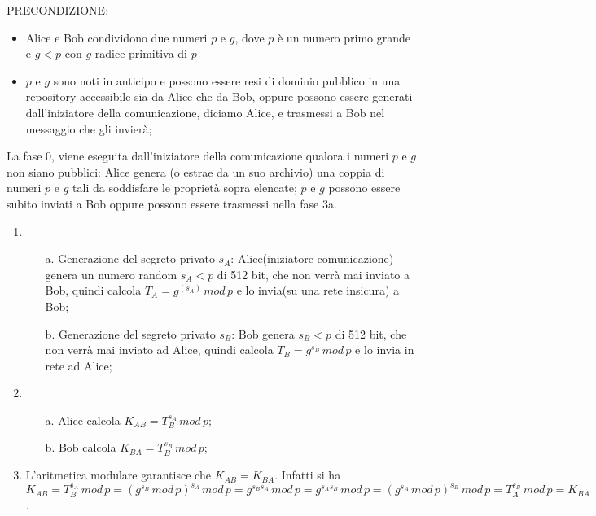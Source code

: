 PRECONDIZIONE: 
\begin{itemize}
\item Alice e Bob condividono due numeri $p$ e $g$, dove $p$ è un numero primo grande e $g<p$ con $g$ radice primitiva di $p$
\item $p$ e $g$ sono noti in anticipo e possono essere resi di dominio pubblico in una repository accessibile sia da Alice che da Bob, oppure possono essere generati dall'iniziatore della comunicazione,
diciamo Alice, e trasmessi a Bob nel messaggio che gli invierà;
\end{itemize}
La fase 0, viene eseguita dall'iniziatore della comunicazione qualora i numeri $p$ e $g$ non siano pubblici: Alice genera (o estrae da un suo archivio) una coppia di numeri $p$ e $g$ tali da soddisfare le proprietà sopra elencate; $p$ e $g$ possono essere subito inviati a Bob oppure possono essere trasmessi nella fase 3a.
\begin{enumerate}
\item \begin{enumerate}
\item [a.] Generazione del segreto privato $s_{A}$: Alice(iniziatore comunicazione) genera un numero random $s_{A}<p$ di 512 bit, che non verrà mai inviato a Bob, quindi calcola $T_{A}=g^(s_{A}) \, mod \,p$ e lo invia(su una rete insicura) a Bob;
\item [b.] Generazione del segreto privato $s_{B}$: Bob genera $s_{B}<p$ di 512 bit, che non verrà mai inviato ad Alice, quindi calcola $T_{B}=g^{s_{B}} \, mod \, p$ e lo invia in rete ad Alice;
\end{enumerate}
\item \begin{enumerate}
\item [a.] Alice calcola $K_{AB}=T_{B}^{s_{A}} \, mod \,p$;
\item [b.] Bob calcola $K_{BA}=T_{B}^{s_{B}} \, mod \, p$;
\end{enumerate}
\item L'aritmetica modulare garantisce che $K_{AB}=K_{BA}$. Infatti si ha $ K_{AB} = T_{B}^{s_{A}} \, mod \,p = ({g^{s_{B}} \, mod \, p})^{s_{A}} \, mod \,p = g^{s_{B}s_{A}} \, mod \, p = g^{s_{A}s_{B}} \, mod \, p = ({g^{s_{A}} \, mod \, p})^{s_{B}} \, mod \,p = T_{A}^{s_{B}} \, mod \, p = K_{BA}$.
\end{enumerate}

